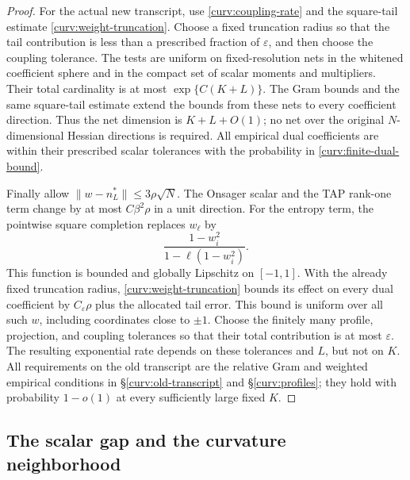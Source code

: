 \documentclass[11pt,reqno]{amsart}
\begin{document}
\begin{proof}
For the actual new transcript, use \eqref{curv:coupling-rate} and the
square-tail estimate \eqref{curv:weight-truncation}. Choose a fixed
truncation radius so that the tail contribution is less than a
prescribed fraction of $\varepsilon$, and then choose the coupling
tolerance. The tests are uniform on fixed-resolution nets in the
whitened coefficient sphere and in the compact set of scalar moments
and multipliers. Their total cardinality is at most
$\exp\{C(K+L)\}$. The Gram bounds and the same square-tail estimate
extend the bounds from these nets to every coefficient direction.
Thus the net dimension is $K+L+O(1)$; no net over the original
$N$-dimensional Hessian directions is required. All empirical dual
coefficients are within their prescribed scalar tolerances with the
probability in \eqref{curv:finite-dual-bound}.

Finally allow $\|w-n_L^*\|\le3\rho\sqrt N$.
The Onsager scalar and the TAP rank-one term change by at most
$C\beta^2\rho$ in a unit direction. For the entropy term, the
pointwise square completion replaces $w_\ell$ by
\[
   \frac{1-w_i^2}{1-\ell(1-w_i^2)}.
\]
This function is bounded and globally Lipschitz on $[-1,1]$. With the
already fixed truncation radius, \eqref{curv:weight-truncation} bounds
its effect on every dual coefficient by
$C_\varepsilon\rho$ plus the allocated tail error. This bound is
uniform over all such $w$, including coordinates close to $\pm1$.
Choose the finitely many profile, projection, and coupling tolerances
so that their total contribution is at most $\varepsilon$.
The resulting exponential rate depends on these tolerances and $L$,
but not on $K$. All requirements on the old transcript are the
relative Gram and weighted empirical conditions in
\S\ref{curv:old-transcript} and \S\ref{curv:profiles}; they hold
with probability $1-o(1)$ at every sufficiently large fixed $K$.
\end{proof}

\subsection{The scalar gap and the curvature neighborhood}
\label{curv:neighborhood}
\end{document}
